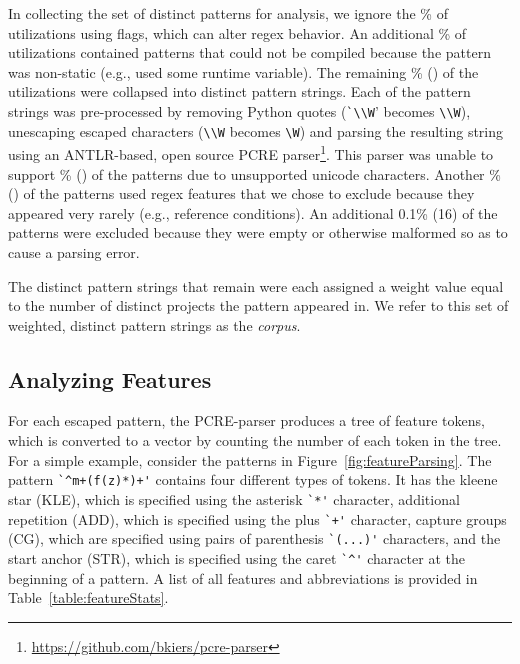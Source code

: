 In collecting the set of distinct patterns for analysis,  we ignore the \%  of utilizations using flags, which can alter regex behavior.  An additional \% of utilizations contained patterns that could not be compiled because the pattern was non-static (e.g., used some runtime variable).
The remaining \% () of the utilizations were collapsed into  distinct pattern strings.  Each of the pattern strings was pre-processed by removing Python quotes (\verb!`\\W!' becomes \verb!\\W!), unescaping escaped characters (\verb!\\W! becomes \verb!\W!) and parsing the resulting  string using an ANTLR-based, open source PCRE parser\footnote{\url{https://github.com/bkiers/pcre-parser}}.
This parser was unable to support \% () of the patterns due to unsupported unicode characters.  Another \% () of the patterns used regex features that we  chose to exclude because they appeared very rarely (e.g., reference conditions).  An additional 0.1\% (16) of the patterns were excluded because they were empty or otherwise malformed so as to cause a parsing error.

The  distinct pattern strings that remain were each assigned a weight value equal to the number of distinct projects the pattern appeared in.  We  refer to this set of weighted, distinct pattern strings as the \emph{corpus}.

\subsection{Analyzing Features}
\label{study:features}
For each escaped pattern, the PCRE-parser produces a tree of feature tokens, which is converted to a vector by counting the number of each token  in the tree.  For a simple example, consider the patterns in Figure~\ref{fig:featureParsing}.  The pattern \verb!`^m+(f(z)*)+'! contains four different types of tokens. It has the kleene star (KLE), which is specified using the asterisk \verb!`*'! character, additional repetition (ADD), which is specified using the plus \verb!`+'! character, capture groups (CG), which are specified using pairs of parenthesis \verb!`(...)'! characters, and the start anchor (STR), which is specified using the caret \verb!`^'! character at the beginning of a pattern. A list of all features and abbreviations is provided in Table~\ref{table:featureStats}.

